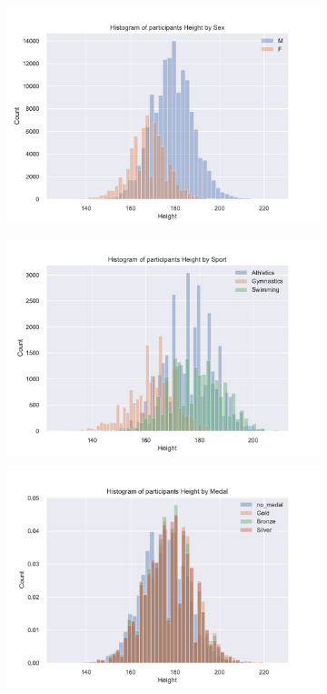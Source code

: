 \documentclass[11pt]{article} %
\begin{document}
\begin{figure}
    \centering
    \begin{subfigure}{.5\textwidth}
    \hspace{-17mm}
    \includegraphics[scale=0.45]{Height_hist_by_Sex.pdf}
    \end{subfigure}%
    \begin{subfigure}{.5\textwidth}
    \includegraphics[scale=0.45]{Height_hist_by_Sport.pdf}
    \end{subfigure}
    \begin{subfigure}{.5\textwidth}
    \includegraphics[scale=0.5]{Height_hist_by_Medal.pdf}

\end{subfigure}
\end{figure}
\end{document}
